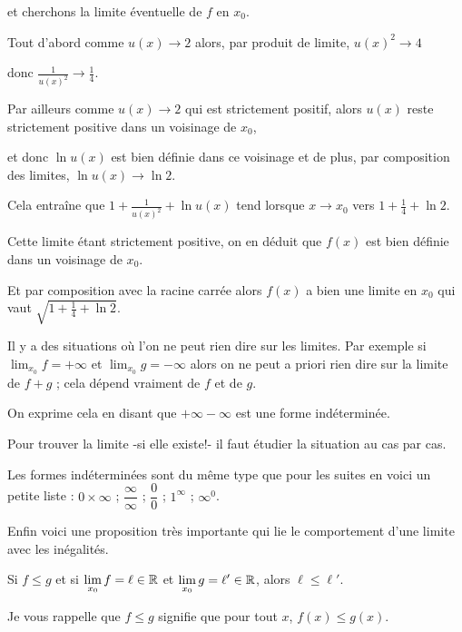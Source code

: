 \change
et cherchons la limite éventuelle de $f$ en $x_0$.

\change
Tout d'abord comme $u(x) \to 2$ alors, par produit de limite, $u(x)^2 \to 4$ 
  
\change
donc $\frac{1}{u(x)^2} \to \frac14$.
  
\change
Par ailleurs comme $u(x) \to 2$ qui est strictement positif, alors $u(x)$ reste strictement positive dans un voisinage de $x_0$,
  
\change
et donc $\ln u(x)$ est bien définie dans ce voisinage et de plus, par composition des limites, $\ln u(x) \to \ln 2$.
  
\change
Cela entraîne que  $1+\frac{1}{u(x)^2}+\ln u(x)$ tend lorsque $x \to x_0$ vers $ 1+\frac 14 + \ln 2$. 
  
\change
Cette limite étant strictement positive, on en déduit que $f(x)$ est bien définie dans un voisinage de $x_0$.
  
\change
Et par composition avec la racine carrée alors $f(x)$ a bien une limite en 
$x_0$ qui vaut $\sqrt{1+\frac14 + \ln 2}$.



\diapo

Il y a des situations où l'on ne peut rien dire sur les limites.
Par exemple si $\lim_{x_0} f = +\infty$ et $\lim_{x_0} g = -\infty$ alors on ne peut 
a priori rien dire sur la limite de $f+g$ ; 
cela dépend vraiment de $f$ et de $g$.

\change

On exprime cela en disant que $+\infty-\infty$ est une forme indéterminée.

Pour trouver la limite -si elle existe!- il faut étudier la situation au cas par cas.

\change


Les formes indéterminées sont du même type que pour les suites en voici
un petite liste : $0\times \infty$ ; 
$\dfrac\infty\infty$ ; $\dfrac00$ ; $1^\infty$ ; $\infty^0$.


\diapo


Enfin voici une proposition très importante qui lie le comportement 
d'une limite avec les inégalités.

Si $f\leq g$ et si $\displaystyle\lim_{x_0} f=\ell\in\mathbb{R}$ et 
$\displaystyle\lim_{x_0} g=\ell'\in\mathbb{R}$, alors $\ell\leq \ell'$.

Je vous rappelle que $f\le g$ signifie que pour tout $x$,
$f(x) \le g(x)$. 

